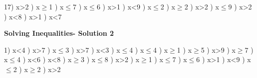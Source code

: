 \documentclass{article}%
\begin{document}
17) x>2%
) x$\geq$1%
) x$\leq$7%
) x$\leq$6%
) x>1%
) x<9%
) x$\leq$2%
) x$\geq$2%
) x>2%
) x$\leq$9%
) x>2%
) x<8%
) x>1%
) x<7%
\newline%
\newpage%
\large%
\begin{center}%
\textbf{Solving Inequalities- Solution 2}%
\newline%
\end{center} \normalsize%
1) x<4%
) x>7%
) x$\leq$3%
) x>7%
) x<3%
) x$\leq$4%
) x$\leq$4%
) x$\geq$1%
) x$\geq$5%
) x>9%
) x$\geq$7%
) x$\leq$4%
) x<6%
) x<8%
) x$\geq$3%
) x$\leq$8%
) x>2%
) x$\geq$1%
) x$\leq$7%
) x$\leq$6%
) x>1%
) x<9%
) x$\leq$2%
) x$\geq$2%
) x>2%
\newline%
\end{document}
